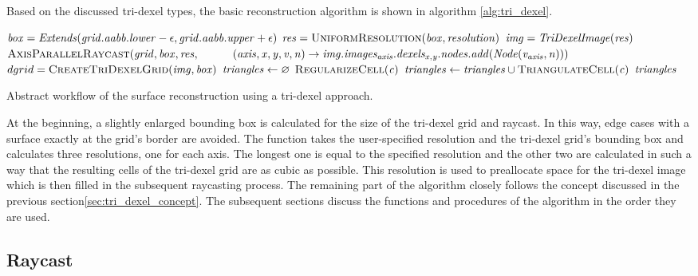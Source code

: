 Based on the discussed tri-dexel types, the basic reconstruction algorithm is shown in algorithm \ref{alg:tri_dexel}.
%
\begin{algorithm}
	\centering
	\begin{algorithmic}[1]
			\State $\mathit{box} = \mathit{Extends}(\mathit{grid.aabb.lower} - \epsilon, \mathit{grid.aabb.upper} + \epsilon)$
			\State $\var{res} = \Call{UniformResolution}{\var{box}, \var{resolution}}$
			\State $\mathit{img} = \mathit{TriDexelImage}(\mathit{res})$
			\State $\Call{AxisParallelRaycast}{\var{grid}, \var{box}, \var{res},\hfill\break
				\hspace*{\dimexpr\algorithmicindent*2}(\var{axis}, \var{x}, \var{y}, \var{v}, \var{n}) \rightarrow \var{img.images_{axis}.dexels_{x, y}.nodes.add}(\var{Node}(\var{v_{axis}}, \var{n}))}$
			\State $dgrid = \Call{CreateTriDexelGrid}{\var{img}, \var{box}}$
			\State $\mathit{triangles} \gets \varnothing$
				\State $\Call{RegularizeCell}{\var{c}}$
				\State $\var{triangles} \gets \var{triangles} \cup \Call{TriangulateCell}{\var{c}}$
			\EndFor
			\State \Return $\mathit{triangles}$
		\EndFunction
	\end{algorithmic}
	\caption{
		Abstract workflow of the surface reconstruction using a tri-dexel approach.
	}
	\label{alg:tri_dexel}
\end{algorithm}
%
At the beginning, a slightly enlarged bounding box is calculated for the size of the tri-dexel grid and raycast.
In this way, edge cases with a surface exactly at the grid's border are avoided.
The  function takes the user-specified resolution and the tri-dexel grid's bounding box and calculates three resolutions, one for each axis.
The longest one is equal to the specified resolution and the other two are calculated in such a way that the resulting cells of the tri-dexel grid are as cubic as possible.
This resolution is used to preallocate space for the tri-dexel image which is then filled in the subsequent raycasting process.
The remaining part of the algorithm closely follows the concept discussed in the previous section\ref{sec:tri_dexel_concept}.
The subsequent sections discuss the functions and procedures of the algorithm in the order they are used.


\subsection{Raycast}
\label{sec:tri_dexel_raycast}

